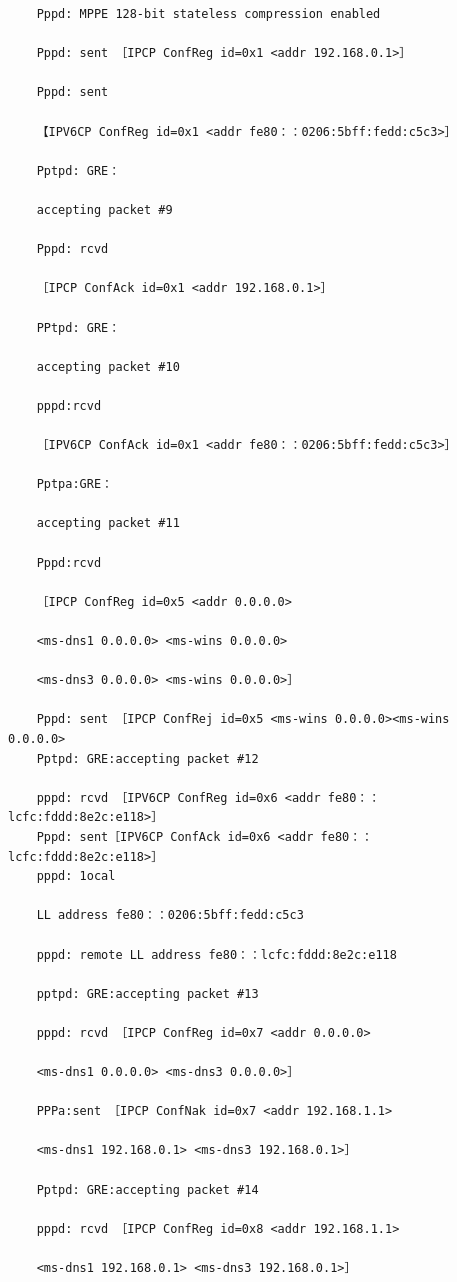 \begin{verbatim}
    Pppd: MPPE 128-bit stateless compression enabled
    
    Pppd: sent ［IPCP ConfReg id=0x1 <addr 192.168.0.1>］
    
    Pppd: sent
    
    【IPV6CP ConfReg id=0x1 <addr fe80：：0206:5bff:fedd:c5c3>］
    
    Pptpd: GRE：
    
    accepting packet #9
    
    Pppd: rcvd
    
    ［IPCP ConfAck id=0x1 <addr 192.168.0.1>］
    
    PPtpd: GRE：
    
    accepting packet #10
    
    pppd:rcvd
    
    ［IPV6CP ConfAck id=0x1 <addr fe80：：0206:5bff:fedd:c5c3>］
    
    Pptpa:GRE：
    
    accepting packet #11
    
    Pppd:rcvd
    
    ［IPCP ConfReg id=0x5 <addr 0.0.0.0>
    
    <ms-dns1 0.0.0.0> <ms-wins 0.0.0.0>
    
    <ms-dns3 0.0.0.0> <ms-wins 0.0.0.0>］
    
    Pppd: sent ［IPCP ConfRej id=0x5 <ms-wins 0.0.0.0><ms-wins 0.0.0.0>
    Pptpd: GRE:accepting packet #12
    
    pppd: rcvd ［IPV6CP ConfReg id=0x6 <addr fe80：：lcfc:fddd:8e2c:e118>］
    Pppd: sent［IPV6CP ConfAck id=0x6 <addr fe80：：lcfc:fddd:8e2c:e118>］
    pppd: 1ocal
    
    LL address fe80：：0206:5bff:fedd:c5c3
    
    pppd: remote LL address fe80：：lcfc:fddd:8e2c:e118
    
    pptpd: GRE:accepting packet #13
    
    pppd: rcvd ［IPCP ConfReg id=0x7 <addr 0.0.0.0>
    
    <ms-dns1 0.0.0.0> <ms-dns3 0.0.0.0>］
    
    PPPa:sent ［IPCP ConfNak id=0x7 <addr 192.168.1.1>
    
    <ms-dns1 192.168.0.1> <ms-dns3 192.168.0.1>］
    
    Pptpd: GRE:accepting packet #14
    
    pppd: rcvd ［IPCP ConfReg id=0x8 <addr 192.168.1.1>
    
    <ms-dns1 192.168.0.1> <ms-dns3 192.168.0.1>］
    

\end{verbatim}
